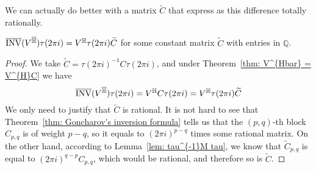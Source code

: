 We can actually do better with a matrix $\widetilde C$ that express as this difference totally rationally.

\begin{corollary}
$\overline{\operatorname{INV}}(V^{\overline{\mathbb H}})\tau(2\pi i)=V^{\mathbb H}\tau(2\pi i)\widetilde C$ for some constant matrix $\widetilde C$ with entries in $\mathbb Q$.
\end{corollary}

\begin{proof}
We take $\widetilde C=\tau(2\pi i)^{-1}C\tau(2\pi i)$, and under Theorem~\ref{thm: V^{Hbar} = V^{H}C} we have
\[
\overline{\operatorname{INV}}(V^{\overline{\mathbb H}})\tau(2\pi i)=V^{\mathbb H}C\tau(2\pi i)=V^{\mathbb H}\tau(2\pi i)\widetilde C
\]
We only need to justify that $\widetilde C$ is rational. It is not hard to see that Theorem~\ref{thm: Goncharov's inversion formula} tells us that the $(p,q)$-th block $C_{p,q}$ is of weight $p-q$, so it equals to $(2\pi i)^{p-q}$ times some rational matrix. On the other hand, according to Lemma~\ref{lem: tau^{-1}M tau}, we know that $\widetilde C_{p,q}$ is equal to $(2\pi i)^{q-p}C_{p,q}$, which would be rational, and therefore so is $\widetilde C$.
\end{proof}

